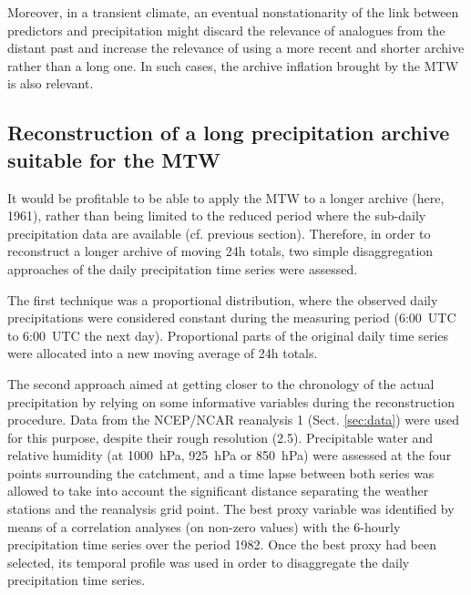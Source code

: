 \documentclass[hess, manuscript]{copernicus}
\begin{document}
	Moreover, in a transient climate, an eventual nonstationarity of the link between predictors and precipitation might discard the relevance of analogues from the distant past and increase the relevance of using a more recent and shorter archive rather than a long one. In such cases, the archive inflation brought by the MTW is also relevant.
	
	
	
	
	
	
	
	

	

	\subsection{Reconstruction of a long precipitation archive suitable for the MTW}
	\label{sec:reconstruction}
	
	
	
	
	
	It would be profitable to be able to apply the MTW to a longer archive (here, 1961), rather than being limited to the reduced period where the sub-daily precipitation data are available (cf. previous section). Therefore, in order to reconstruct a longer archive of moving 24h totals, two simple disaggregation approaches of the daily precipitation time series were assessed.
	
	The first technique was a proportional distribution, where the observed daily precipitations were considered constant during the measuring period (6:00~UTC to 6:00~UTC the next day). Proportional parts of the original daily time series were allocated into a new moving average of 24h totals. 
	
	The second approach aimed at getting closer to the chronology of the actual precipitation by relying on some informative variables during the reconstruction procedure. Data from the NCEP/NCAR reanalysis 1 (Sect. \ref{sec:data}) were used for this purpose, despite their rough resolution (2.5\textdegree). Precipitable water and relative humidity (at 1000~hPa, 925~hPa or 850~hPa) were assessed at the four points surrounding the catchment, and a time lapse between both series was allowed to take into account the significant distance separating the weather stations and the reanalysis grid point. The best proxy variable was identified by means of a correlation analyses (on non-zero values) with the 6-hourly precipitation time series over the period 1982. Once the best proxy had been selected, its temporal profile was used in order to disaggregate the daily precipitation time series.
	
\end{document}
